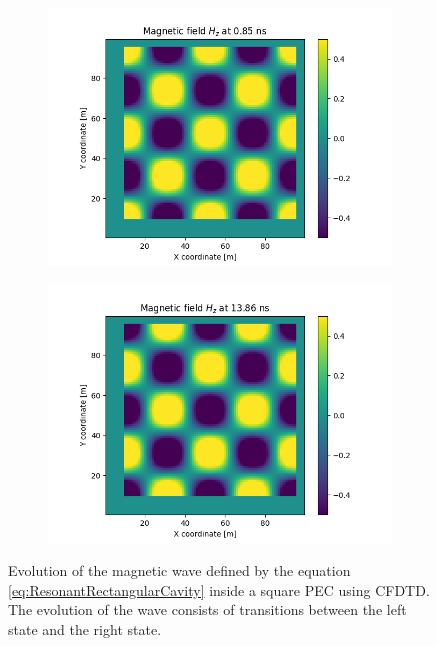 \documentclass[12pt, oneside]{book}
\begin{document}
\begin{figure}[h!]
    \centering
    \begin{subfigure}[b]{0.49\textwidth}
        \centering
        \includegraphics[width=\textwidth]{Imagenes/CFDTD2D_ResonantRectangularCavity1.png}
    \end{subfigure}
    \begin{subfigure}[b]{0.49\textwidth}
        \centering
        \includegraphics[width=\textwidth]{Imagenes/CFDTD2D_ResonantRectangularCavity2.png}
    \end{subfigure}
    \caption{Evolution of the magnetic wave defined by the equation \ref{eq:ResonantRectangularCavity} inside a square PEC using CFDTD. The evolution of the wave consists of transitions between the left state and the right state.}
    \label{fig:CFDTD2D_RectangularResonantCavity}
\end{figure}
\end{document}
